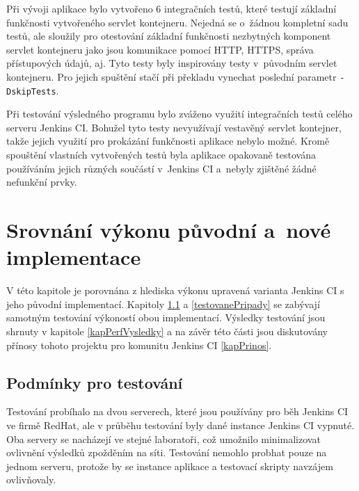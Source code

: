     \medskip
    Při vývoji aplikace bylo vytvořeno 6 integračních testů, které testují základní funkčnosti
    vytvořeného servlet kontejneru. Nejedná se o~žádnou kompletní sadu testů, ale sloužily pro
    otestování základní funkčnosti nezbytných komponent servlet kontejneru jako jsou
    komunikace pomocí HTTP, HTTPS, správa přístupových údajů, aj. Tyto testy byly inspirovány
    testy v~původním servlet kontejneru. Pro jejich spuštění stačí při překladu vynechat poslední
    parametr \texttt{-DskipTests}.

    Při testování výsledného programu bylo zváženo využití integračních testů celého serveru Jenkins CI.
    Bohužel tyto testy nevyužívají vestavěný servlet kontejner, takže jejich využití
    pro prokázání funkčnosti aplikace nebylo možné.
    Kromě spouštění vlastních vytvořených testů byla aplikace opakovaně testována používáním jejich různých součástí
    v~Jenkins CI
    a~nebyly zjištěné žádné nefunkční prvky.

    


\chapter{Srovnání výkonu původní a~nové implementace}  \label{kapPerformance}
    V této kapitole je porovnána z hlediska výkonu upravená varianta Jenkins CI s jeho původní implementací.
    Kapitoly \ref{kapPodminky} a \ref{testovanePripady} se zabývají samotným testování
    výkoností obou implementací. Výsledky testování jsou shrnuty v kapitole \ref{kapPerfVysledky}
    a na závěr této části jsou diskutovány přínosy tohoto projektu pro komunitu Jenkins CI \ref{kapPrinos}.

    \section{Podmínky pro testování}\label{kapPodminky}
        Testování probíhalo na dvou serverech, které jsou používány pro běh Jenkins CI ve firmě RedHat, ale
        v průběhu testování byly dané instance Jenkins CI vypnuté. 
        Oba servery se nacházejí ve stejné laboratoři, což umožnilo minimalizovat
        ovlivnění výsledků zpožděním na síti. Testování nemohlo probhat pouze na jednom
        serveru, protože by se instance aplikace a testovací skripty navzájem ovlivňovaly.
        
